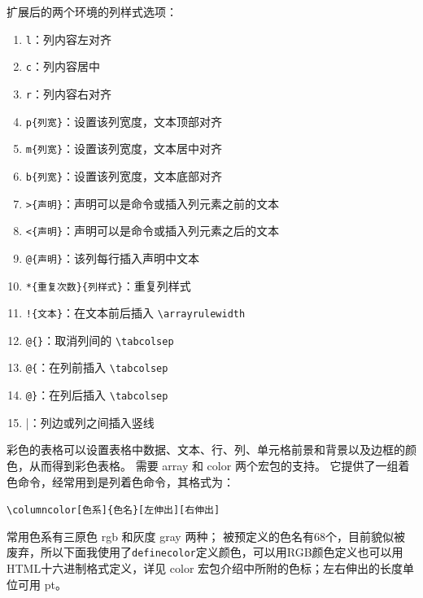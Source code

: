 扩展后的两个环境的列样式选项：

\begin{enumerate}[label=(\arabic*)]
    \item \verb|l|：列内容左对齐
    \item \verb|c|：列内容居中
    \item \verb|r|：列内容右对齐
    \item \verb|p{列宽}|：设置该列宽度，文本顶部对齐
    \item \verb|m{列宽}|：设置该列宽度，文本居中对齐
    \item \verb|b{列宽}|：设置该列宽度，文本底部对齐
    \item \verb|>{声明}|：声明可以是命令或插入列元素之前的文本
    \item \verb|<{声明}|：声明可以是命令或插入列元素之后的文本
    \item \verb|@{声明}|：该列每行插入声明中文本
    \item \verb|*{重复次数}{列样式}|：重复列样式
    \item \verb|!{文本}|：在文本前后插入 \verb|\arrayrulewidth|
    \item \verb|@{}|：取消列间的 \verb|\tabcolsep|
    \item \verb|@{|：在列前插入 \verb|\tabcolsep|
    \item \verb|@}|：在列后插入 \verb|\tabcolsep|
    \item \verb|||：列边或列之间插入竖线
\end{enumerate}

彩色的表格可以设置表格中数据、文本、行、列、单元格前景和背景以及边框的颜色，从而得到彩色表格。
需要 array 和 color 两个宏包的支持。
它提供了一组着色命令，经常用到是列着色命令，其格式为：

\verb|\columncolor[色系]{色名}[左伸出][右伸出]|

常用色系有三原色 rgb 和灰度 gray 两种；
被预定义的色名有68个，目前貌似被废弃，所以下面我使用了\verb|definecolor|定义颜色，可以用RGB颜色定义也可以用HTML十六进制格式定义，详见 color 宏包介绍中所附的色标；左右伸出的长度单位可用 pt。

